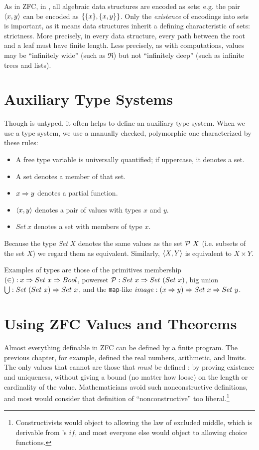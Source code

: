 As in ZFC, in \lzfclang, all algebraic data structures are encoded as sets; e.g. the pair $\langle{x,y}\rangle$ can be encoded as $\{{\{{x}\},\{{x,y}\}}\}$.
Only the \emph{existence} of encodings into sets is important, as it means data structures inherit a defining characteristic of sets: strictness.
More precisely, in every data structure, every path between the root and a leaf must have finite length.
Less precisely, as with computations, values may be ``infinitely wide'' (such as $\Re$) but not ``infinitely deep'' (such as infinite trees and lists).

\section{Auxiliary Type Systems}

Though \lzfclang is untyped, it often helps to define an auxiliary type system.
When we use a type system, we use a manually checked, polymorphic one characterized by these rules:
\begin{itemize}
	\item A free type variable is universally quantified; if uppercase, it denotes a set.
	\item A set denotes a member of that set.
	\item $x \Rightarrow y$ denotes a partial function.
	\item $\langle{x,y}\rangle$ denotes a pair of values with types $x$ and $y$.
	\item $Set~x$ denotes a set with members of type $x$.
\end{itemize}
Because the type $Set~X$ denotes the same values as the set $\mathcal{P}~X$ (i.e. subsets of the set $X$) we regard them as equivalent.
Similarly, $\langle{X,Y}\rangle$ is equivalent to $X \times Y$.

Examples of types are those of the \lzfclang primitives membership $(\in) : x \Rightarrow Set~x \Rightarrow Bool$, powerset $\mathcal{P} : Set~x \Rightarrow Set~(Set~x)$, big union $\textstyle\bigcup : Set~(Set~x) \Rightarrow Set~x$, and the \texttt{map}-like $image : (x \Rightarrow y) \Rightarrow Set~x \Rightarrow Set~y$.

\section{Using ZFC Values and Theorems}

Almost everything definable in ZFC can be defined by a finite \lzfclang program.
The previous chapter, for example, defined the real numbers, arithmetic, and limits.
The only values that cannot are those that \emph{must} be defined : by proving existence and uniqueness, without giving a bound (no matter how loose) on the length or cardinality of the value.
Mathematicians avoid such nonconstructive definitions, and most would consider that definition of ``nonconstructive'' too liberal.\footnote{Constructivists would object to allowing the law of excluded middle, which is derivable from \lzfclang's $if$, and most everyone else would object to allowing choice functions.}

